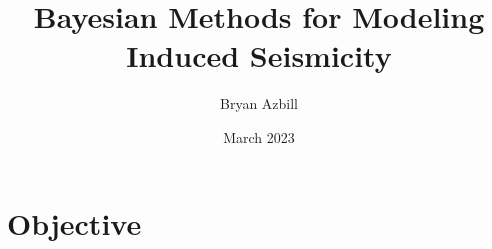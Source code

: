 \documentclass{article}
\title{Bayesian Methods for Modeling Induced Seismicity}
\author{Bryan Azbill}
\date{March 2023}
\begin{document}
\maketitle
\section{Objective}
\end{document}
